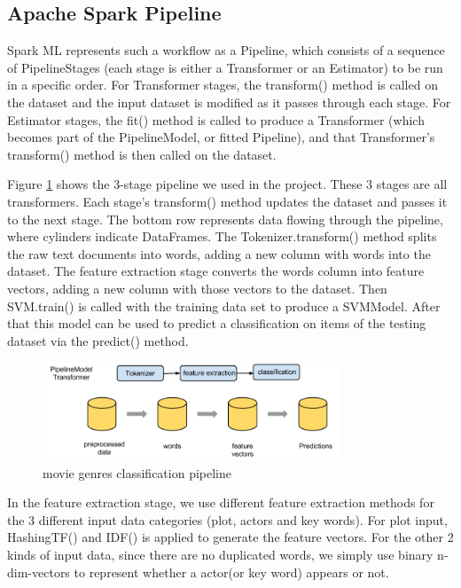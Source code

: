 \documentclass{vldb}
\begin{document}
\subsection{Apache Spark Pipeline}
\par Spark ML\cite{sparkml} represents such a workflow as a Pipeline, which consists of a sequence of PipelineStages (each stage is either a Transformer or an Estimator) to be run in a specific order. For Transformer stages, the transform() method is called on the dataset and the input dataset is modified as it passes through each stage. For Estimator stages, the fit() method is called to produce a Transformer (which becomes part of the PipelineModel, or fitted Pipeline), and that Transformer's transform() method is then called on the dataset.
\par Figure \ref{fig:pipeline} shows the 3-stage pipeline we used in the project. These 3 stages are all transformers.  Each stage's transform() method updates the dataset and passes it to the next stage. The bottom row represents data flowing through the pipeline, where cylinders indicate DataFrames. The Tokenizer.transform() method splits the raw text documents into words, adding a new column with words into the dataset. The feature extraction stage converts the words column into feature vectors, adding a new column with those vectors to the dataset. Then SVM.train() is called with the training data set to produce a SVMModel. After that this model can be used to predict a classification on items of the testing dataset via the predict() method.
\begin{figure}
\begin{center}
\includegraphics[width=3.50in]{pipeline.png}
\caption{movie genres classification pipeline}
\label{fig:pipeline}
\end{center}
\end{figure}
\par In the feature extraction stage, we use different feature extraction methods for the 3 different input data categories (plot, actors and key words). For plot input, HashingTF() and IDF() is applied to generate the feature vectors. For the other 2 kinds of input data, since there are no duplicated words, we simply use binary n-dim-vectors to represent whether a actor(or key word) appears or not.
\end{document}

